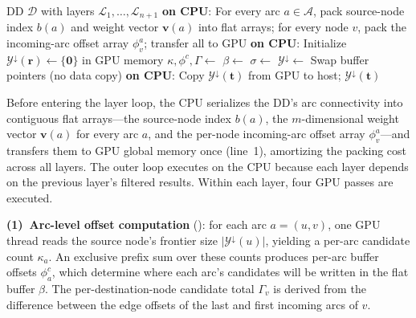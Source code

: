 \documentclass[letterpaper]{article}
\begin{document}
\begin{algorithm}[tbp!]
\caption{GPU-Accelerated Top-Down Pareto Frontier Enumeration}
\label{alg:gpu_top_down_pf}
\begin{algorithmic}[1]
\Require DD $\mathcal{D}$ with layers $\mathcal{L}_1,\dots,\mathcal{L}_{n+1}$
\State \textbf{on CPU}: For every arc $a \in \mathcal{A}$, pack source-node index $b(a)$ and weight vector $\mathbf{v}(a)$ into flat arrays; for every node $v$, pack the incoming-arc offset array $\phi^a_v$; transfer all to GPU 
\State \textbf{on CPU}: Initialize $\mathcal{Y}^{\downarrow}(\mathbf{r}) \gets \{\mathbf{0}\}$ in GPU memory
    \State $\kappa, \phi^c, \Gamma \gets$ 
    \State $\beta \gets$ 
    \State $\sigma \gets$ 
    \State $\mathcal{Y}^{\downarrow} \gets$  
    \State Swap buffer pointers (no data copy)
\EndFor
\State \textbf{on CPU}: Copy $\mathcal{Y}^{\downarrow}(\mathbf{t})$ from GPU to host; \Return $\mathcal{Y}^{\downarrow}(\mathbf{t})$
\end{algorithmic}
\end{algorithm}

Before entering the layer loop, the CPU serializes the DD's arc connectivity into contiguous flat arrays---the source-node index $b(a)$, the $m$-dimensional weight vector $\mathbf{v}(a)$ for every arc $a$, and the per-node incoming-arc offset array $\phi^a_v$---and transfers them to GPU global memory once (line~1), amortizing the packing cost across all layers. The outer loop executes on the CPU because each layer depends on the previous layer's filtered results. Within each layer, four GPU passes are executed.

\textbf{(1)~Arc-level offset computation} (): for each arc $a = (u,v)$, one GPU thread reads the source node's frontier size $|\mathcal{Y}^{\downarrow}(u)|$, yielding a per-arc candidate count $\kappa_a$. An exclusive prefix sum over these counts produces per-arc buffer offsets $\phi^c_a$, which determine where each arc's candidates will be written in the flat buffer $\beta$. The per-destination-node candidate total $\Gamma_v$ is derived from the difference between the edge offsets of the last and first incoming arcs of $v$.
\end{document}
